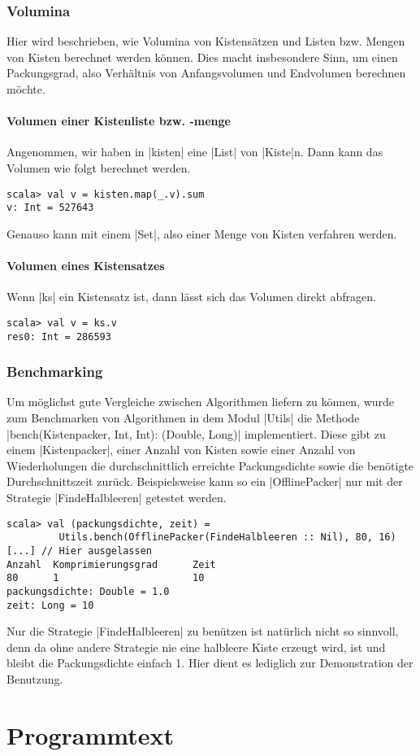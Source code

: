 \subsubsection{Volumina}
 Hier wird beschrieben, wie Volumina von Kistensätzen und Listen bzw. Mengen von Kisten berechnet werden können.
 Dies macht insbesondere Sinn, um einen Packungsgrad, also Verhältnis von Anfangsvolumen und Endvolumen berechnen möchte.
\\
\paragraph{Volumen einer Kistenliste bzw. -menge}
 Angenommen, wir haben in |kisten| eine |List| von |Kiste|n. Dann kann das Volumen wie folgt berechnet werden.
\begin{lstlisting}
scala> val v = kisten.map(_.v).sum
v: Int = 527643
\end{lstlisting}
 Genauso kann mit einem |Set|, also einer Menge von Kisten verfahren werden.
\paragraph{Volumen eines Kistensatzes}
 Wenn |ks| ein Kistensatz ist, dann lässt sich das Volumen direkt abfragen.
\begin{lstlisting}
scala> val v = ks.v
res0: Int = 286593
\end{lstlisting}
\subsubsection{Benchmarking}
Um möglichst gute Vergleiche zwischen Algorithmen liefern zu können,
wurde zum Benchmarken von Algorithmen in dem Modul |Utils| die Methode |bench(Kistenpacker, Int, Int): (Double, Long)| implementiert.
Diese gibt zu einem |Kistenpacker|,
einer Anzahl von Kisten sowie einer Anzahl von Wiederholungen die durchschnittlich erreichte Packungsdichte sowie die benötigte Durchschnittszeit zurück.
Beispielsweise kann so ein |OfflinePacker| nur mit der Strategie |FindeHalbleeren| getestet werden.
\begin{lstlisting}
scala> val (packungsdichte, zeit) =
         Utils.bench(OfflinePacker(FindeHalbleeren :: Nil), 80, 16)
[...] // Hier ausgelassen
Anzahl  Komprimierungsgrad      Zeit
80      1                       10
packungsdichte: Double = 1.0
zeit: Long = 10
\end{lstlisting}
 Nur die Strategie |FindeHalbleeren| zu benützen ist natürlich nicht so sinnvoll,
  denn da ohne andere Strategie nie eine halbleere Kiste erzeugt wird, ist und bleibt die Packungsdichte einfach 1.
 Hier dient es lediglich zur Demonstration der Benutzung.
\section{Programmtext}
